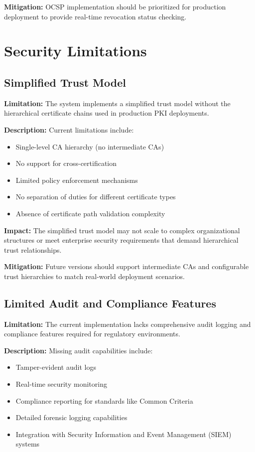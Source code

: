 \textbf{Mitigation:} OCSP implementation should be prioritized for production deployment to provide real-time revocation status checking.

\section{Security Limitations}

\subsection{Simplified Trust Model}

\textbf{Limitation:} The system implements a simplified trust model without the hierarchical certificate chains used in production PKI deployments.

\textbf{Description:} Current limitations include:
\begin{itemize}
    \item Single-level CA hierarchy (no intermediate CAs)
    \item No support for cross-certification
    \item Limited policy enforcement mechanisms
    \item No separation of duties for different certificate types
    \item Absence of certificate path validation complexity
\end{itemize}

\textbf{Impact:} The simplified trust model may not scale to complex organizational structures or meet enterprise security requirements that demand hierarchical trust relationships.

\textbf{Mitigation:} Future versions should support intermediate CAs and configurable trust hierarchies to match real-world deployment scenarios.

\subsection{Limited Audit and Compliance Features}

\textbf{Limitation:} The current implementation lacks comprehensive audit logging and compliance features required for regulatory environments.

\textbf{Description:} Missing audit capabilities include:
\begin{itemize}
    \item Tamper-evident audit logs
    \item Real-time security monitoring
    \item Compliance reporting for standards like Common Criteria
    \item Detailed forensic logging capabilities
    \item Integration with Security Information and Event Management (SIEM) systems
\end{itemize}

